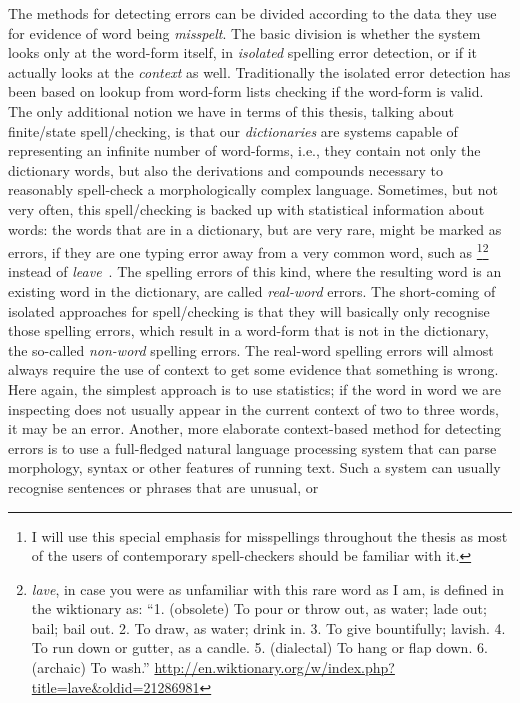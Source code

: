 \documentclass[officiallayout]{unihelcompling}
\newcommand\misspelt{\bgroup\markoverwith
{\textcolor{red}{\lower3.5pt\hbox{\sixly \char58}}}\ULon}
\begin{document}
The methods for detecting errors can be divided according to the data they use
for evidence of word being \emph{misspelt}. The basic division is whether the
system looks only at the word-form itself, in \emph{isolated} spelling error
detection, or if it actually looks at the \emph{context} as well. Traditionally
the isolated error detection has been based on lookup from word-form lists
checking if the word-form is valid. The only additional notion we have in terms
of this thesis, talking about finite\-/state spell\-/checking, is that our
\emph{dictionaries} are systems capable of representing an infinite number of
word-forms, i.e., they contain not only the dictionary words, but also the
derivations and compounds necessary to reasonably spell-check a morphologically
complex language. Sometimes, but not very often, this spell\-/checking is backed
up with statistical information about words: the words that are in a
dictionary, but are very rare, might be marked as errors, if they are one
typing error away from a very common word, such as \misspelt{lave}\footnote{I
    will use this special emphasis for misspellings throughout the thesis as
    most of the users of contemporary spell-checkers should be familiar with
it.}\footnote{\emph{lave}, in case you were as unfamiliar with this rare word as I am, is defined in the wiktionary as: ``1. (obsolete) To pour or throw out,
    as water; lade out; bail; bail out. 2. To draw, as water; drink in. 3. 
    To give bountifully; lavish. 4. To run down or gutter, as a candle. 5.
    (dialectal) To hang or flap down. 6. (archaic) To wash.''
\url{http://en.wiktionary.org/w/index.php?title=lave&oldid=21286981}} instead
of \emph{leave}~\citep{kukich1992techniques}.  The spelling errors
of this kind, where the resulting word is an existing word in the dictionary,
are called \emph{real-word} errors.  The short-coming of isolated approaches
for spell\-/checking is that they will basically only recognise those spelling
errors, which result in a word-form that is not in the dictionary, the
so-called \emph{non-word} spelling errors. The real-word spelling errors will
almost always require the use of context to get some evidence that something is
wrong. Here again, the simplest approach is to use statistics; if the word in
word we are inspecting does not usually appear in the current context of two to
three words, it may be an error. Another, more elaborate context-based method
for detecting errors is to use a full-fledged natural language processing
system that can parse morphology, syntax or other features of running text.
Such a system can usually recognise sentences or phrases that are unusual, or
\end{document}
